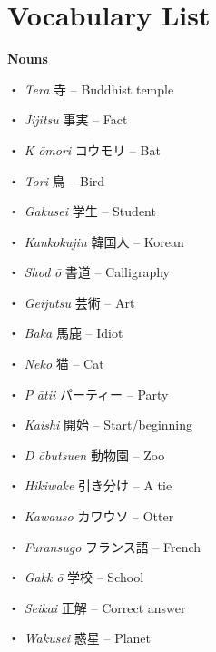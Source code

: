 \section{Vocabulary List}
 
\par{\textbf{Nouns }}
 
\par{・ \emph{Tera }寺 – Buddhist temple }

\par{・ \emph{Jijitsu }事実 – Fact }

\par{・ \emph{K }\emph{ōmori }コウモリ – Bat }

\par{・ \emph{Tori }鳥 – Bird }

\par{・ \emph{Gakusei }学生 – Student }

\par{・ \emph{Kankokujin }韓国人 – Korean }

\par{・ \emph{Shod }\emph{ō }書道 – Calligraphy }

\par{・ \emph{Geijutsu }芸術 – Art }

\par{・ \emph{Baka }馬鹿 – Idiot }

\par{・ \emph{Neko }猫 – Cat }

\par{・ \emph{P }\emph{ātii }パーティー – Party }

\par{・ \emph{Kaishi }開始 – Start\slash beginning }

\par{・ \emph{D }\emph{ōbutsuen }動物園 – Zoo }

\par{・ \emph{Hikiwake }引き分け – A tie }

\par{・ \emph{Kawauso }カワウソ – Otter }

\par{・ \emph{Furansugo }フランス語 – French }

\par{・ \emph{Gakk }\emph{ō }学校 – School }

\par{・ \emph{Seikai }正解 – Correct answer }

\par{・ \emph{Wakusei }惑星 – Planet }

